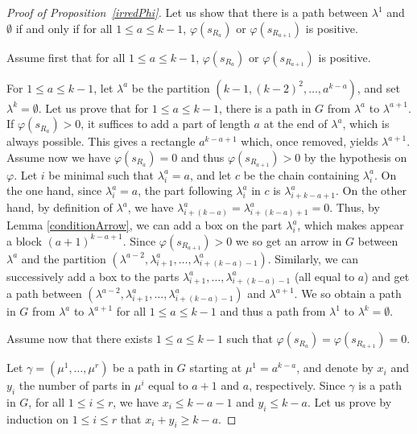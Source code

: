 \documentclass[10pt,a4paper]{amsart}
\theoremstyle{definition}
\begin{document}
\begin{proof}
[Proof of Proposition~\ref{irredPhi}]Let us show that there is a path between
$\lambda^{1}$ and $\emptyset$ if and only if for all $1\leq a\leq k-1$,
$\varphi(s_{R_{a}})$ or $\varphi(s_{R_{a+1}})$ is positive.

Assume first that for all $1\leq a\leq k-1$, $\varphi(s_{R_{a}})$ or
$\varphi(s_{R_{a+1}})$ is positive.

\noindent For $1\leq a\leq k-1$, let $\lambda^{a}$ be the partition
$(k-1,(k-2)^{2},\ldots,a^{k-a})$, and set $\lambda^{k}=\emptyset$. Let us
prove that for $1\leq a\leq k-1$, there is a path in $G$ from $\lambda^{a}$ to
$\lambda^{a+1}$. If $\varphi(s_{R_{a}})>0$, it suffices to add a part of
length $a$ at the end of $\lambda^{a}$, which is always possible. This gives a
rectangle $a^{k-a+1}$ which, once removed, yields $\lambda^{a+1}$. Assume now
we have $\varphi(s_{R_{a}})=0$ and thus $\varphi(s_{R_{a+1}})>0$ by the
hypothesis on $\varphi$. Let $i$ be minimal such that $\lambda_{i}^{a}=a$, and
let $c$ be the chain containing $\lambda_{i}^{a}$. On the one hand, since
$\lambda_{i}^{a}=a$, the part following $\lambda_{i}^{a}$ in $c$ is
$\lambda_{i+k-a+1}^{a}$. On the other hand, by definition of $\lambda^{a}$, we
have $\lambda_{i+(k-a)}^{a}=\lambda_{i+(k-a)+1}^{a}=0$. Thus, by Lemma
\ref{conditionArrow}, we can add a box on the part $\lambda_{i}^{a}$, which
makes appear a block $(a+1)^{k-a+1}$. Since $\varphi(s_{R_{a+1}})>0$ we so get
an arrow in $G$ between $\lambda^{a}$ and the partition $(\lambda
^{a-2},\lambda_{i+1}^{a},\ldots,\lambda_{i+(k-a)-1}^{a})$. Similarly, we can
successively add a box to the parts $\lambda_{i+1}^{a},\ldots,\lambda
_{i+(k-a)-1}^{a}$ (all equal to $a$) and get a path between $(\lambda
^{a-2},\lambda_{i+1}^{a},\ldots,\lambda_{i+(k-a)-1}^{a})$ and $\lambda^{a+1}$.
We so obtain a path in $G$ from $\lambda^{a}$ to $\lambda^{a+1}$ for all
$1\leq a\leq k-1$ and thus a path from $\lambda^{1}$ to $\lambda^{k}%
=\emptyset$.

Assume now that there exists $1\leq a\leq k-1$ such that $\varphi(s_{R_{a}%
})=\varphi(s_{R_{a+1}})=0$.

\noindent
Let $\gamma=(\mu^{1},\ldots,\mu^{r})$ be a path in $G$ starting at
$\mu^{1}=a^{k-a}$, and denote by $x_{i}$ and $y_{i}$ the number of parts in
$\mu^{i}$ equal to $a+1$ and $a$, respectively. Since $\gamma$ is a path in
$G$, for all $1\leq i\leq r$, we have $x_{i}\leq k-a-1$ and $y_{i}\leq k-a$.
Let us prove by induction on $1\leq i\leq r$ that $x_{i}+y_{i}\geq k-a$.


\end{proof}
\end{document}
